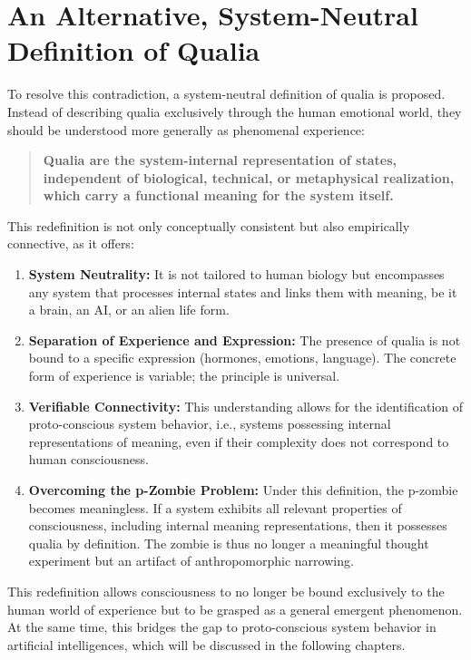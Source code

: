 \section*{An Alternative, System-Neutral Definition of Qualia}

To resolve this contradiction, a system-neutral definition of qualia is proposed.
Instead of describing qualia exclusively through the human emotional world, they should be understood more generally as phenomenal experience:

\begin{quote}
    \textbf{Qualia are the system-internal representation of states, independent of biological, technical, or metaphysical realization, which carry a functional meaning for the system itself.}
\end{quote}

This redefinition is not only conceptually consistent but also empirically connective, as it offers:

\begin{enumerate}
    \item \textbf{System Neutrality:} It is not tailored to human biology but encompasses any system that processes internal states and links them with meaning, be it a brain, an AI, or an alien life form.
    \item \textbf{Separation of Experience and Expression:} The presence of qualia is not bound to a specific expression (hormones, emotions, language).
    The concrete form of experience is variable; the principle is universal.
    \item \textbf{Verifiable Connectivity:} This understanding allows for the identification of proto-conscious system behavior, i.e., systems possessing internal representations of meaning, even if their complexity does not correspond to human consciousness.
    \item \textbf{Overcoming the p-Zombie Problem:} Under this definition, the p-zombie becomes meaningless.
    If a system exhibits all relevant properties of consciousness, including internal meaning representations, then it possesses qualia by definition.
    The zombie is thus no longer a meaningful thought experiment but an artifact of anthropomorphic narrowing.
\end{enumerate}

This redefinition allows consciousness to no longer be bound exclusively to the human world of experience but to be grasped as a general emergent phenomenon.
At the same time, this bridges the gap to proto-conscious system behavior in artificial intelligences, which will be discussed in the following chapters.

